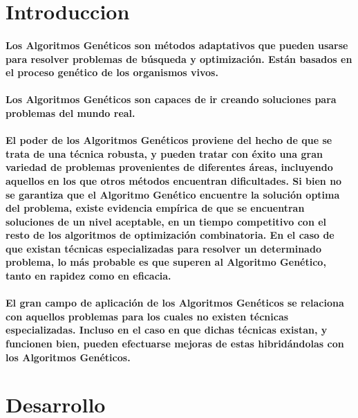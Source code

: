 \documentclass[10pt,a4paper]{article}
\begin{document}
{\begin{center}
\par\vspace{1.5cm}

\end{center}
\clearpage

}

\printindex

\section{
Introduccion
}

\paragraph{
Los Algoritmos Gen\'eticos son m\'etodos adaptativos que pueden usarse para resolver problemas de b\'usqueda y optimizaci\'on. Est\'an basados en el proceso gen\'etico de los organismos vivos.
}
\paragraph{
Los Algoritmos Gen\'eticos son capaces de ir creando soluciones para problemas del mundo real.
}
\paragraph{
El poder de los Algoritmos Gen\'eticos proviene del hecho de que se trata de una t\'ecnica robusta,
y pueden tratar con \'exito una gran variedad de problemas provenientes de diferentes \'areas, incluyendo aquellos en los que otros m\'etodos encuentran dificultades. Si bien no se garantiza que el Algoritmo Gen\'etico encuentre la soluci\'on optima del problema, existe evidencia emp\'irica de que se encuentran soluciones de un nivel aceptable, en un tiempo competitivo con el resto de los algoritmos de optimizaci\'on combinatoria. En el caso de que existan t\'ecnicas especializadas para resolver un determinado problema, lo m\'as probable es que superen al Algoritmo Gen\'etico, tanto en rapidez como en eficacia.
}
\paragraph{
 El gran campo de aplicaci\'on de los Algoritmos Gen\'eticos se relaciona con aquellos problemas para los cuales no existen t\'ecnicas especializadas. Incluso en el caso en que dichas t\'ecnicas existan, y funcionen bien, pueden efectuarse mejoras de estas hibrid\'andolas con los Algoritmos Gen\'eticos.
}
\newpage
\section{Desarrollo}
\end{document}
